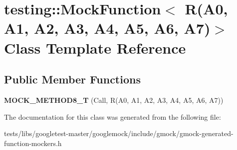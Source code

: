 \hypertarget{classtesting_1_1MockFunction_3_01R_07A0_00_01A1_00_01A2_00_01A3_00_01A4_00_01A5_00_01A6_00_01A7_08_4}{}\section{testing\+:\+:Mock\+Function$<$ R(A0, A1, A2, A3, A4, A5, A6, A7)$>$ Class Template Reference}
\label{classtesting_1_1MockFunction_3_01R_07A0_00_01A1_00_01A2_00_01A3_00_01A4_00_01A5_00_01A6_00_01A7_08_4}
\subsection*{Public Member Functions}
\begin{DoxyCompactItemize}
\item 
\mbox{\label{classtesting_1_1MockFunction_3_01R_07A0_00_01A1_00_01A2_00_01A3_00_01A4_00_01A5_00_01A6_00_01A7_08_4_a895c470e00e07294ab42c09588ae1e4c}} 
{\bfseries M\+O\+C\+K\+\_\+\+M\+E\+T\+H\+O\+D8\+\_\+T} (Call, R(A0, A1, A2, A3, A4, A5, A6, A7))
\end{DoxyCompactItemize}


The documentation for this class was generated from the following file\+:\begin{DoxyCompactItemize}
\item 
tests/libs/googletest-\/master/googlemock/include/gmock/gmock-\/generated-\/function-\/mockers.\+h\end{DoxyCompactItemize}
